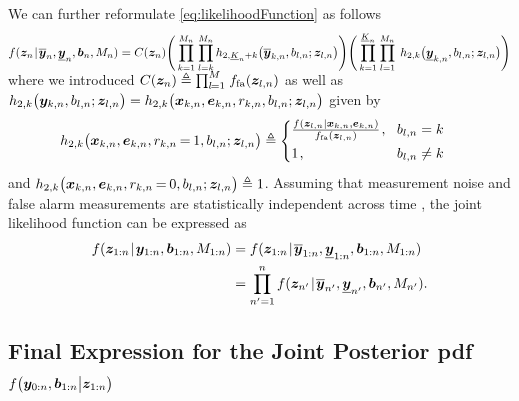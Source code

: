 \documentclass[11pt,a4paper]{article}
\newcommand{\ist}{\hspace*{.3mm}}
\newcommand{\rmv}{\hspace*{-.3mm}}
\newcommand{\nn}{\nonumber}
\begin{document}
We can further reformulate \eqref{eq:likelihoodFunction} as \vspace{0mm} follows
\begin{align}
f(\V{z}_n \ist | \ist \overline{\V{y}}_n, \underline{\V{y}}_n, \V{b}_n, M_n) = C(\V{z}_n) \Bigg( \prod^{M_n}_{k = 1} \ist \prod^{M_n}_{l = k} h_{2,\underline{K}_n+k}\big( \overline{\V{y}}_{k,n}, b_{l,n}; \V{z}_{l,n} \big) \Bigg) \Bigg( \prod^{\underline{K}_n}_{k = 1} \ist \prod^{M_n}_{l=1} \ist\ist\ist h_{2,k}\big( \underline{\V{y}}_{k,n}, b_{l,n}; \V{z}_{l,n} \big) \Bigg)\label{eq:likelihoodFunction2} \\[-8.5mm]
\nn
\end{align}
where we introduced $C(\V{z}_n) \triangleq \prod^M_{l \rmv=\rm1} \ist f_{\mathrm{fa}}(\V{z}_{l,n})$ as well as $h_{2,k}\big( \bm{y}_{k,n}, b_{l,n}; \bm{z}_{l,n} \big) = h_{2,k}\big( \bm{x}_{k,n}, \bm{e}_{k,n}, r_{k,n}, b_{l,n}; \bm{z}_{l,n} \big)$ given \vspace{-2.5mm} by
\begin{align}
&h_{2,k}\big( \V{x}_{k,n},  \V{e}_{k,n}, r_{k,n} \rmv=\rmv 1, b_{l,n}; \V{z}_{l,n} \big) \triangleq \begin{cases}
      \frac{ f(\V{z}_{l,n}| \V{x}_{k,n}, \V{e}_{k,n})}{  f_{\mathrm{fa}}(\V{z}_{l,n})}    \ist, 
       & \rmv\rmv b_{l,n} = k \\[1mm]
     1 \ist,  & \rmv\rmv b_{l,n} \neq k 
  \end{cases} \nn
\end{align}
and $h_{2,k}\big( \V{x}_{k,n}, \V{e}_{k,n}, r_{k,n} \rmv=\rmv 0,  b_{l,n}; \V{z}_{l,n} \big)  \triangleq 1 $. Assuming that measurement noise and false alarm measurements are statistically independent across time \cite{MeyKroWilLauHlaBraWin:J18,GraFatSve:J19}, the joint likelihood function can be expressed as
\begin{align}
f(\V{z}_{1:n} \ist | \ist \V{y}_{1:n}, \V{b}_{1:n}, M_{1:n})  &= f(\V{z}_{1:n} \ist | \ist \overline{\V{y}}_{1:n}, \underline{\V{y}}_{1:n},  \V{b}_{1:n}, M_{1:n}) \nn\\
&= \prod^{n}_{n' = 1} f(\V{z}_{n'} \ist | \ist \overline{\V{y}}_{n'}, \underline{\V{y}}_{n'}, \V{b}_{n'}, M_{n'}).
\label{eq:likelihoodFunctionFinal}
\end{align}

\subsection{Final Expression for the Joint Posterior \ac{pdf} $f \big( \bm{y}_{0:n}, \bm{b}_{1:n} \big |\bm{z}_{1:n} \big)$}
\label{sec:jointPosterior}
\end{document}
